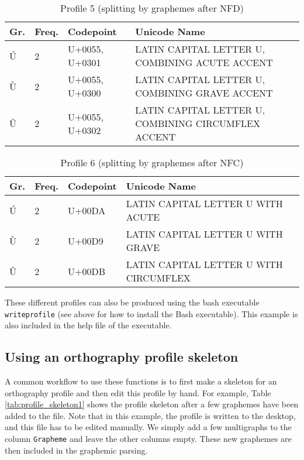 \documentclass[output=book,nonflat,modfonts,
citecolor=brown,
		]{langsci/langscibook}\usepackage[]{graphicx}\usepackage[]{color}
\begin{document}
\begin{table}[H]
\centering
\begingroup\scriptsize
\begin{tabular}{llll}
  \toprule
Gr. & Freq. & Codepoint & Unicode Name \\ 
  \midrule
Ú & 2 & U+0055, U+0301 & LATIN CAPITAL LETTER U, COMBINING ACUTE ACCENT \\ 
  Ù & 2 & U+0055, U+0300 & LATIN CAPITAL LETTER U, COMBINING GRAVE ACCENT \\ 
  Û & 2 & U+0055, U+0302 & LATIN CAPITAL LETTER U, COMBINING CIRCUMFLEX ACCENT \\ 
   \bottomrule
\end{tabular}
\endgroup
\caption{Profile 5 (splitting by graphemes after NFD)} 
\label{tab:profile5}
\end{table}


\begin{table}[H]
\centering
\begingroup\scriptsize
\begin{tabular}{llll}
  \toprule
Gr. & Freq. & Codepoint & Unicode Name \\ 
  \midrule
Ú & 2 & U+00DA & LATIN CAPITAL LETTER U WITH ACUTE \\ 
  Ù & 2 & U+00D9 & LATIN CAPITAL LETTER U WITH GRAVE \\ 
  Û & 2 & U+00DB & LATIN CAPITAL LETTER U WITH CIRCUMFLEX \\ 
   \bottomrule
\end{tabular}
\endgroup
\caption{Profile 6 (splitting by graphemes after NFC)} 
\label{tab:profile6}
\end{table}


These different profiles can also be produced using the bash
executable \texttt{writeprofile} (see above for how to install the Bash executable). 
This example is also included in the help file of the executable.



\subsection*{Using an orthography profile skeleton}
\label{profile-skeleton}

A common workflow to use these functions is to first make a skeleton for an
orthography profile and then edit this profile by hand. For example, Table
\ref{tab:profile_skeleton1} shows the profile skeleton after a few graphemes have
been added to the file. Note that in this example, the profile is written to the
desktop, and this file has to be edited manually. We simply add a few
multigraphs to the column \texttt{Grapheme} and leave the other columns empty.
These new graphemes are then included in the graphemic parsing.
\end{document}
